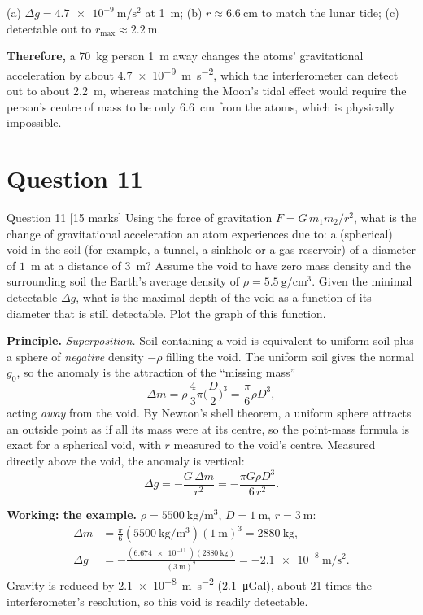 \documentclass[11pt]{article}
\newcommand{\closing}[1]{\par\medskip\noindent\textbf{Therefore,} #1}
\begin{document}
\begin{answerbox}
(a) $\Delta g = \SI{4.7e-9}{\metre\per\second\squared}$ at \SI{1}{\metre};
(b) $r\approx\SI{6.6}{\centi\metre}$ to match the lunar tide;
(c) detectable out to $r_{\max}\approx\SI{2.2}{\metre}$.
\closing{a \SI{70}{\kilogram} person \SI{1}{\metre} away changes the atoms' gravitational acceleration
by about \SI{4.7e-9}{\metre\per\second\squared}, which the interferometer can detect out to about
\SI{2.2}{\metre}, whereas matching the Moon's tidal effect would require the person's centre of mass
to be only \SI{6.6}{\centi\metre} from the atoms, which is physically impossible.}
\end{answerbox}

\section{Question 11}

\begin{problembox}{Question 11 \hfill [15 marks]}
Using the force of gravitation $F=G\,m_1 m_2/r^2$, what is the change of gravitational acceleration an
atom experiences due to: a (spherical) void in the soil (for example, a tunnel, a sinkhole or a gas
reservoir) of a diameter of $1$~m at a distance of $3$~m? Assume the void to have zero mass density
and the surrounding soil the Earth's average density of $\rho=5.5~\mathrm{g}/\mathrm{cm}^3$. Given the
minimal detectable $\Delta g$, what is the maximal depth of the void as a function of its diameter that
is still detectable. Plot the graph of this function.
\end{problembox}

\textbf{Principle.} \emph{Superposition.} Soil containing a void is equivalent to uniform soil plus a
sphere of \emph{negative} density $-\rho$ filling the void. The uniform soil gives the normal $g_0$, so
the anomaly is the attraction of the ``missing mass''
\[
\Delta m = \rho\,\frac{4}{3}\pi\Big(\frac D2\Big)^3 = \frac{\pi}{6}\rho D^3 ,
\]
acting \emph{away} from the void. By Newton's shell theorem, a uniform sphere attracts an outside
point as if all its mass were at its centre, so the point-mass formula is exact for a spherical void,
with $r$ measured to the void's centre. Measured directly above the void, the anomaly is vertical:
\[
\Delta g = -\frac{G\,\Delta m}{r^2} = -\frac{\pi G\rho D^3}{6\,r^2}.
\]

\textbf{Working: the example.} $\rho = \SI{5500}{\kilogram\per\metre\cubed}$, $D=\SI{1}{\metre}$,
$r=\SI{3}{\metre}$:
\begin{align*}
\Delta m &= \tfrac{\pi}{6}(\SI{5500}{\kilogram\per\metre\cubed})(\SI{1}{\metre})^3 = \SI{2880}{\kilogram},\\
\Delta g &= -\frac{(\SI{6.674e-11}{})(\SI{2880}{\kilogram})}{(\SI{3}{\metre})^2}
= \SI{-2.1e-8}{\metre\per\second\squared}.
\end{align*}
Gravity is reduced by \SI{2.1e-8}{\metre\per\second\squared} (\SI{2.1}{\micro Gal}), about 21 times
the interferometer's resolution, so this void is readily detectable.
\end{document}
